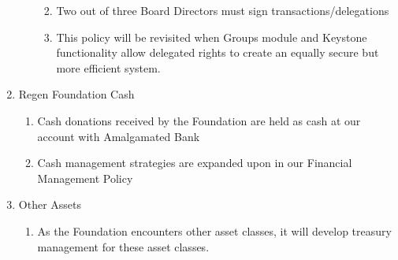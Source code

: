\documentclass{article}
\begin{document}
\begin{enumerate}
\begin{enumerate}
\begin{enumerate}
\begin{enumerate}
\end{enumerate}
\item Two out of three Board Directors must sign transactions/delegations
\item This policy will be revisited when Groups module and Keystone functionality allow delegated rights to create an equally secure but more efficient system.
\end{enumerate}
\end{enumerate}
\item Regen Foundation Cash
\begin{enumerate}
\item Cash donations received by the Foundation are held as cash at our account with Amalgamated Bank
\item Cash management strategies are expanded upon in our Financial Management Policy
\end{enumerate}
\item Other Assets
\begin{enumerate}
\item As the Foundation encounters other asset classes, it will develop treasury management for these asset classes.
\end{enumerate}
\end{enumerate}
\end{document}
